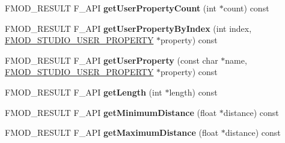 \begin{DoxyCompactItemize}
\item 
\hypertarget{class_f_m_o_d_1_1_studio_1_1_event_description_a49b615ff992c42bed77d3d300cf8712e}{F\+M\+O\+D\+\_\+\+R\+E\+S\+U\+L\+T F\+\_\+\+A\+P\+I {\bfseries get\+User\+Property\+Count} (int $\ast$count) const }\label{class_f_m_o_d_1_1_studio_1_1_event_description_a49b615ff992c42bed77d3d300cf8712e}

\item 
\hypertarget{class_f_m_o_d_1_1_studio_1_1_event_description_af19d8901f1d96d93c6cc48c235cfc895}{F\+M\+O\+D\+\_\+\+R\+E\+S\+U\+L\+T F\+\_\+\+A\+P\+I {\bfseries get\+User\+Property\+By\+Index} (int index, \hyperlink{struct_f_m_o_d___s_t_u_d_i_o___u_s_e_r___p_r_o_p_e_r_t_y}{F\+M\+O\+D\+\_\+\+S\+T\+U\+D\+I\+O\+\_\+\+U\+S\+E\+R\+\_\+\+P\+R\+O\+P\+E\+R\+T\+Y} $\ast$property) const }\label{class_f_m_o_d_1_1_studio_1_1_event_description_af19d8901f1d96d93c6cc48c235cfc895}

\item 
\hypertarget{class_f_m_o_d_1_1_studio_1_1_event_description_afcdd3e6b4b9413364d378db417294683}{F\+M\+O\+D\+\_\+\+R\+E\+S\+U\+L\+T F\+\_\+\+A\+P\+I {\bfseries get\+User\+Property} (const char $\ast$name, \hyperlink{struct_f_m_o_d___s_t_u_d_i_o___u_s_e_r___p_r_o_p_e_r_t_y}{F\+M\+O\+D\+\_\+\+S\+T\+U\+D\+I\+O\+\_\+\+U\+S\+E\+R\+\_\+\+P\+R\+O\+P\+E\+R\+T\+Y} $\ast$property) const }\label{class_f_m_o_d_1_1_studio_1_1_event_description_afcdd3e6b4b9413364d378db417294683}

\item 
\hypertarget{class_f_m_o_d_1_1_studio_1_1_event_description_a9a410a7525abe7e05047c28c29c43321}{F\+M\+O\+D\+\_\+\+R\+E\+S\+U\+L\+T F\+\_\+\+A\+P\+I {\bfseries get\+Length} (int $\ast$length) const }\label{class_f_m_o_d_1_1_studio_1_1_event_description_a9a410a7525abe7e05047c28c29c43321}

\item 
\hypertarget{class_f_m_o_d_1_1_studio_1_1_event_description_ab5f395eac9a873d8fb2adc84c014416e}{F\+M\+O\+D\+\_\+\+R\+E\+S\+U\+L\+T F\+\_\+\+A\+P\+I {\bfseries get\+Minimum\+Distance} (float $\ast$distance) const }\label{class_f_m_o_d_1_1_studio_1_1_event_description_ab5f395eac9a873d8fb2adc84c014416e}

\item 
\hypertarget{class_f_m_o_d_1_1_studio_1_1_event_description_adacd85a12ce9bcf3d347b6364c5c50a7}{F\+M\+O\+D\+\_\+\+R\+E\+S\+U\+L\+T F\+\_\+\+A\+P\+I {\bfseries get\+Maximum\+Distance} (float $\ast$distance) const }\label{class_f_m_o_d_1_1_studio_1_1_event_description_adacd85a12ce9bcf3d347b6364c5c50a7}


\end{DoxyCompactItemize}
